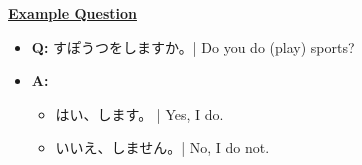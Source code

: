 \documentclass{article}
\begin{document}
\begin{CJK}{UTF8}{min}
\clearpage

\underline{\bf Example Question}

\begin{itemize}
\item {\bf Q:} すぽうつをしますか。| Do you do (play) sports?
\item {\bf A:}
\begin{itemize}
\item はい、します。 | Yes, I do.
\item いいえ、しません。| No, I do not.
\end{itemize}
\end{itemize}














\end{CJK}
\end{document}
